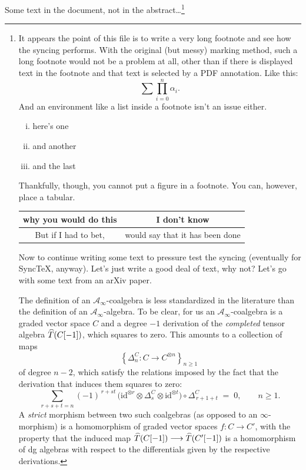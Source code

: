 \documentclass{amsart}
\begin{document}
Some text in the document, not in the abstract\dots\footnote[1234567890]{It appears the point of this file is to write a very long footnote and see how the syncing performs. With the original (but messy) marking method, such a long footnote would not be a problem at all, other than if there is displayed text in the footnote and that text is selected by a PDF annotation. Like this:
\[
\sum\prod^n_{i = 0} \alpha_i .
\]
And an environment like a list inside a footnote isn't an issue either.
\begin{enumerate}[(i)]
\item here's one
\item and another
\item and the last
\end{enumerate}
Thankfully, though, you cannot put a figure in a footnote. You can, however, place a tabular.

\begin{tabular}{|c|c|}
\hline
why you would do this & I don't know \\
\hline
But if I had to bet, & would say that it has been done \\
\hline
\end{tabular}

Now to continue writing some text to pressure test the syncing (eventually for SyncTeX, anyway). Let's just write a good deal of text, why not? Let's go with some text from an arXiv paper.

The definition of an $\mathcal A_\infty$-coalgebra is less standardized in the literature than the definition of an $\mathcal A_\infty$-algebra. To be clear, for us an $\mathcal A_\infty$-coalgebra is a graded vector space $C$ and a degree $-1$ derivation of the \emph{completed} tensor algebra $\smash{\widehat T}(C[-1])$, which squares to zero. This amounts to a collection of maps
\[
\left\{ \Delta_n^C: C \longrightarrow C^{\otimes n} \right\}_{n \geq 1}~
\]
of degree $n-2$, which satisfy the relations imposed by the fact that the derivation that induces them squares to zero:
\[
\sum_{r+s+t = n}
(-1)^{\,r + s t}\,
\bigl(
\mathrm{id}^{\otimes r}
\otimes \Delta_s^C
\otimes \mathrm{id}^{\otimes t}
\bigr)
\circ \Delta_{\,r+1+t}^C
\;=\; 0,
\qquad n \ge 1 .
\]
A \emph{strict} morphism between two such coalgebras (as opposed to an $\infty$-morphism) is a homomorphism of graded vector spaces $f: C \longrightarrow C'$, with the property that the induced map $\smash{\widehat T}(C[-1]) \longrightarrow \smash{\widehat T}(C'[-1])$ is a homomorphism of dg algebras with respect to the differentials given by the respective derivations.}
\end{document}
